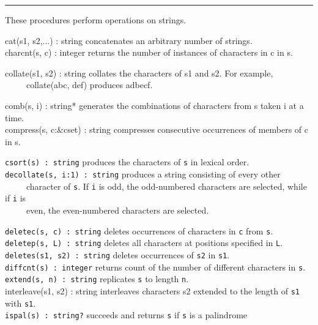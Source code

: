 \vspace{0.25cm}\hrule{}

These procedures perform operations on strings. 

\textsf{cat(s1, s2,...) : string} concatenates an arbitrary number of
strings.\\
\textsf{charcnt(s, c) : integer} returns the number of instances of
characters in c in s.

\textsf{collate(s1, s2) : string} collates the characters
of s1 and s2. For example,\\
 \ \ \ \ \ \textsf{collate({\textquotedbl}abc{\textquotedbl},
{\textquotedbl}def{\textquotedbl})} produces
\textsf{{\textquotedbl}adbecf{\textquotedbl}}.

\textsf{comb(s, i) : string*} generates the combinations of characters from s taken i at a time.\\
\textsf{compress(s, c:\&cset) : string} compresses consecutive
occurrences of members of c in s.

\texttt{csort(s) : string} produces the characters of \texttt{s} in
lexical order.\\
\texttt{decollate(s, i:1) : string} produces a string consisting of
every other\\
 \ \ \ \ \ character of \texttt{s}. If \texttt{i} is odd, the
odd-numbered characters are selected, while if \texttt{i} is\\
 \ \ \ \ \ even, the even-numbered characters are selected.

\texttt{deletec(s, c) : string} deletes occurrences of characters in
\texttt{c} from \texttt{s}.\\
\texttt{deletep(s, L) : string} deletes all characters at positions
specified in \texttt{L}.\\
\texttt{deletes(s1, s2) : string} deletes occurrences of \texttt{s2} in
\texttt{s1}.\\
\texttt{diffcnt(s) : integer} returns count of the number of different
characters in \texttt{s}.\\
\texttt{extend(s, n) : string} replicates \texttt{s} to length
\texttt{n}.\\
\textsf{interleave(s1, s2) : string} interleaves characters \textsf{s2}
extended to the length of \texttt{s1} with \texttt{s1}.\\
\texttt{ispal(s) : string?} succeeds and returns \texttt{s} if
\texttt{s} is a palindrome

